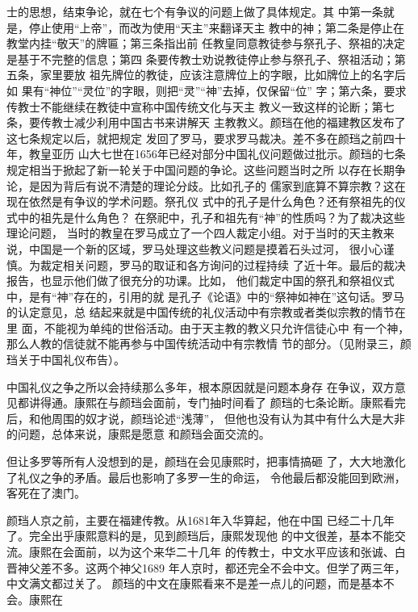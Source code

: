 士的思想，结束争论，就在七个有争议的问题上做了具体规定。其%
中第一条就是，停止使用“上帝”，而改为使用“天主”来翻译天主%
教中的神；第二条是停止在教堂内挂“敬天”的牌匾；第三条指出前%
任教皇同意教徒参与祭孔子、祭祖的决定是基于不完整的信息；第四%
条要传教士劝说教徒停止参与祭孔子、祭祖活动；第五条，家里要放%
祖先牌位的教徒，应该注意牌位上的字眼，比如牌位上的名字后如%
果有“神位”“灵位”的字眼，则把“灵”“神”去掉，仅保留“位”%
字；第六条，要求传教士不能继续在教徒中宣称中国传统文化与天主%
教义一致这样的论断；第七条，要传教士减少利用中国古书来讲解天%
主教教义。颜珰在他的福建教区发布了这七条规定以后，就把规定%
发回了罗马，要求罗马裁决。差不多在颜珰之前四十年，教皇亚历%
山大七世在1656年已经对部分中国礼仪问题做过批示。颜珰的七条%
规定相当于掀起了新一轮关于中国问题的争论。这些问题当时之所%
以存在长期争论，是因为背后有说不清楚的理论分歧。比如孔子的%
儒家到底算不算宗教？这在现在依然是有争议的学术问题。祭孔仪%
式中的孔子是什么角色？还有祭祖先的仪式中的祖先是什么角色？%
在祭祀中，孔子和祖先有“神”的性质吗？为了裁决这些理论问题，%
当时的教皇在罗马成立了一个四人裁定小组。对于当时的天主教来%
说，中国是一个新的区域，罗马处理这些教义问题是摸着石头过河，%
很小心谨慎。为裁定相关问题，罗马的取证和各方询问的过程持续%
了近十年。最后的裁决报告，也显示他们做了很充分的功课。比如，%
他们裁定中国的祭孔和祭祖仪式中，是有“神”存在的，引用的就%
是孔子《论语》中的“祭神如神在”这句话。罗马的认定意见，总%
结起来就是中国传统的礼仪活动中有宗教或者类似宗教的情节在里%
面，不能视为单纯的世俗活动。由于天主教的教义只允许信徒心中%
有一个神，那么人教的信徒就不能再参与中国传统活动中有宗教情%
节的部分。（见附录三，颜珰关于中国礼仪布告）。%
\par
中国礼仪之争之所以会持续那么多年，根本原因就是问题本身存%
在争议，双方意见都讲得通。康熙在与颜珰会面前，专门抽时间看了%
颜珰的七条论断。康熙看完后，和他周围的奴才说，颜珰论述“浅薄”，%
但他也没有认为其中有什么大是大非的问题，总体来说，康熙是愿意%
和颜珰会面交流的。%
\par
但让多罗等所有人没想到的是，颜珰在会见康熙时，把事情搞砸%
了，大大地激化了礼仪之争的矛盾。最后也影响了多罗一生的命运，%
令他最后都没能回到欧洲，客死在了澳门。%
\par
颜珰人京之前，主要在福建传教。从1681年入华算起，他在中国%
已经二十几年了。完全出乎康熙意料的是，见到颜珰后，康熙发现他%
的中文很差，基本不能交流。康熙在会面前，以为这个来华二十几年%
的传教士，中文水平应该和张诚、白晋神父差不多。这两个神父1689%
年人京时，都还完全不会中文。但学了两三年，中文满文都过关了。%
颜珰的中文在康熙看来不是差一点儿的问题，而是基本不会。康熙在%
